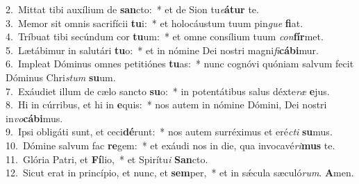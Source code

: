 {2.~}Mittat tibi auxílium de \textbf{san}cto:~* et de Sion tu\textit{e}\textbf{á}\textbf{tur} te.\\
{3.~}Memor sit omnis sacrifícii \textbf{tu}i:~* et holocáustum tuum pin\textit{gue} \textbf{fi}at.\\
{4.~}Tríbuat tibi secúndum cor \textbf{tu}um:~* et omne consílium tuum \textit{con}\textbf{fír}met.\\
{5.~}Lætábimur in salutári \textbf{tu}o:~* et in nómine Dei nostri magni\textit{fi}\textbf{cá}\textbf{bi}mur.\\
{6.~}Impleat Dóminus omnes petitiónes \textbf{tu}as:~* nunc cognóvi quóniam salvum fecit Dóminus Chri\textit{stum} \textbf{su}um.\\
{7.~}Exáudiet illum de cælo sancto \textbf{su}o:~* in potentátibus salus déxte\textit{ræ} \textbf{e}jus.\\
{8.~}Hi in cúrribus, et hi in \textbf{e}quis:~* nos autem in nómine Dómini, Dei nostri in\textit{vo}\textbf{cá}\textbf{bi}mus.\\
{9.~}Ipsi obligáti sunt, et ceci\textbf{dé}runt:~* nos autem surréximus et eré\textit{cti} \textbf{su}mus.\\
{10.~}Dómine salvum fac \textbf{re}gem:~* et exáudi nos in die, qua invocavé\textit{ri}\textbf{mus} te.\\
{11.~}Glória Patri, et \textbf{Fí}lio,~* et Spirítu\textit{i} \textbf{San}cto.\\
{12.~}Sicut erat in princípio, et nunc, et \textbf{sem}per,~* et in sǽcula sæculó\textit{rum}. \textbf{A}men.\\
